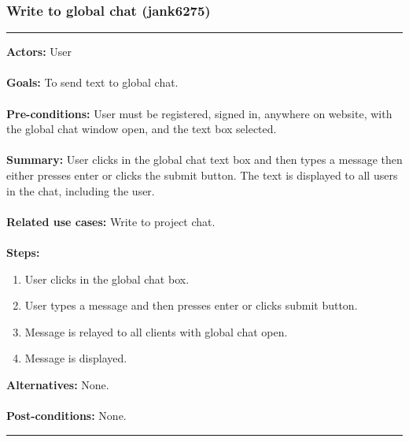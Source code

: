 \documentclass[11pt]{report}
\begin{document}
\subsubsection{Write to global chat (jank6275)}
\vspace{2pt}
\hrule
\vspace{8pt}
 \textbf{Actors:} User \\ \\
\textbf{Goals:} To send text to global chat. \\ \\
 \textbf{Pre-conditions:} User must be registered, signed in, anywhere on website, with the global chat window open, and the text box selected.  \\ \\
 \textbf{Summary:} User clicks in the global chat text box and then types a message then either presses enter or clicks the submit button. The text is displayed to all users in the chat, including the user. \\ \\
\textbf{Related use cases:} Write to project chat. \\ \\
\textbf{Steps:} \begin{enumerate}
  \item User clicks in the global chat box.
  \item User types a message and then presses enter or clicks submit button.
  \item Message is relayed to all clients with global chat open.
  \item Message is displayed.
 \end{enumerate}
 \textbf{Alternatives:} None. \\ \\
 \textbf{Post-conditions:} None. \\
\vspace{8pt}
\hrule
\newpage
\end{document}
